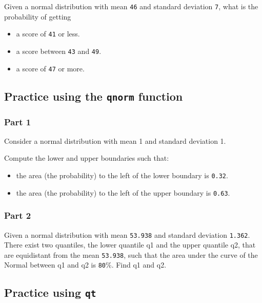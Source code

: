 \documentclass[12pt,]{krantz}
\providecommand{\tightlist}{%
  \setlength{\itemsep}{0pt}\setlength{\parskip}{0pt}}
\theoremstyle{definition}
\theoremstyle{definition}
\theoremstyle{definition}
\theoremstyle{remark}
\begin{document}
Given a normal distribution with mean \texttt{46} and standard deviation \texttt{7}, what is the probability of getting

\begin{itemize}
\tightlist
\item
  a score of \texttt{41} or less.
\item
  a score between \texttt{43} and \texttt{49}.
\item
  a score of \texttt{47} or more.
\end{itemize}

\hypertarget{practice-using-the-qnorm-function}{%
\subsection{\texorpdfstring{Practice using the \texttt{qnorm} function}{Practice using the qnorm function}}\label{practice-using-the-qnorm-function}}

\hypertarget{part-1-1}{%
\subsubsection{Part 1}\label{part-1-1}}

Consider a normal distribution with mean 1 and standard deviation 1.

Compute the lower and upper boundaries such that:

\begin{itemize}
\tightlist
\item
  the area (the probability) to the left of the lower boundary is \texttt{0.32}.
\item
  the area (the probability) to the left of the upper boundary is \texttt{0.63}.
\end{itemize}

\hypertarget{part-2-1}{%
\subsubsection{Part 2}\label{part-2-1}}

Given a normal distribution with mean \texttt{53.938} and standard deviation \texttt{1.362}. There exist two quantiles, the lower quantile q1 and the upper quantile q2, that are equidistant from the mean \texttt{53.938}, such that the area under the curve of the Normal between q1 and q2 is \texttt{80}\%. Find q1 and q2.

\hypertarget{practice-using-qt}{%
\subsection{\texorpdfstring{Practice using \texttt{qt}}{Practice using qt}}\label{practice-using-qt}}
\end{document}
